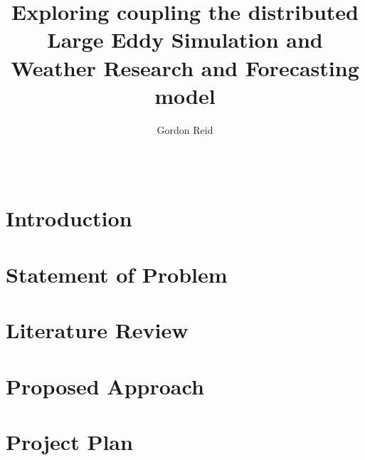 \documentclass{acm_proc_article-sp}
\title{Exploring coupling the distributed Large Eddy Simulation and Weather
Research and Forecasting model}
\author{
    \alignauthor
    Gordon Reid\\
    \affaddr{School of Computing Science}\\
    \affaddr{University of Glasgow}\\
    \email{1002536r@student.gla.ac.uk}
}
\begin{document}
\maketitle

\begin{abstract}

\end{abstract}

\section{Introduction}


\section{Statement of Problem}


\section{Literature Review}


\section{Proposed Approach}


\section{Project Plan}




\end{document}
